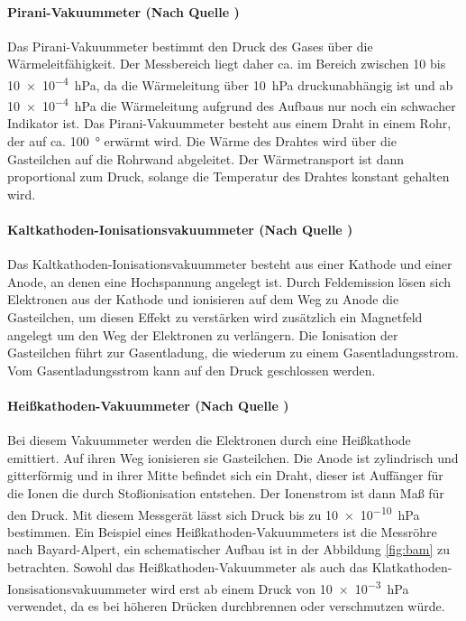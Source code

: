 \paragraph{Pirani-Vakuummeter (Nach Quelle \cite{pfeiffer:mg})}
Das Pirani-Vakuummeter bestimmt den Druck des Gases über die Wärmeleitfähigkeit. Der Messbereich 
liegt daher ca. im Bereich zwischen 10 bis \SI{10e-4}{\hecto\pascal}, da die Wärmeleitung 
über \SI{10}{\hecto\pascal} druckunabhängig ist und ab \SI{10e-4}{\hecto\pascal} die Wärmeleitung 
aufgrund des Aufbaus nur noch ein schwacher Indikator ist. Das Pirani-Vakuummeter besteht aus einem 
Draht in einem Rohr, der auf ca. \SI{100}{\degree} erwärmt wird. Die Wärme des Drahtes wird über 
die Gasteilchen auf die Rohrwand abgeleitet. Der Wärmetransport ist dann proportional zum Druck, 
solange die Temperatur des Drahtes konstant gehalten wird.  

\paragraph{Kaltkathoden-Ionisationsvakuummeter (Nach Quelle \cite{pfeiffer:mg})}
Das Kaltkathoden-Ionisationsvakuummeter besteht aus einer Kathode und einer Anode, an denen eine 
Hochspannung angelegt ist. Durch Feldemission lösen sich Elektronen aus der Kathode und ionisieren 
auf dem Weg zu Anode die Gasteilchen, um diesen Effekt zu verstärken wird zusätzlich ein 
Magnetfeld angelegt um den Weg der Elektronen zu verlängern. Die Ionisation der Gasteilchen 
führt zur Gasentladung, die wiederum zu einem Gasentladungsstrom. Vom Gasentladungsstrom 
kann auf den Druck geschlossen werden. 

\paragraph{Heißkathoden-Vakuummeter (Nach Quelle \cite{pfeiffer:mg})}
Bei diesem Vakuummeter werden die Elektronen durch eine Heißkathode emittiert. Auf ihren Weg 
ionisieren sie Gasteilchen. Die Anode ist zylindrisch und gitterförmig und in ihrer Mitte befindet 
sich ein Draht, dieser ist Auffänger für die Ionen die durch Stoßionisation entstehen. Der 
Ionenstrom ist dann Maß für den Druck. Mit diesem Messgerät lässt sich Druck bis zu 
\SI{10e-10}{\hecto\pascal} bestimmen. Ein Beispiel eines Heißkathoden-Vakuummeters ist die 
Messröhre nach Bayard-Alpert, ein schematischer Aufbau ist in der Abbildung \ref{fig:bam} zu 
betrachten.
\newline 
Sowohl das Heißkathoden-Vakuummeter als auch das Klatkathoden-Ionsisationsvakuummeter wird erst ab 
einem Druck von \SI{10e-3}{\hecto\pascal} verwendet, da es bei höheren Drücken durchbrennen oder 
verschmutzen würde.

